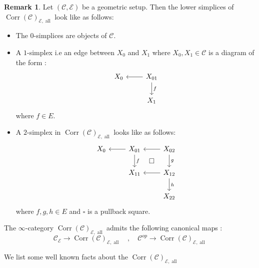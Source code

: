 \documentclass[14pt]{article}
\theoremstyle{definition}
\newtheorem{remark}[theorem]{Remark}
\newcommand{\E}{\mathcal{E}}
\newcommand{\op}[1]{\operatorname{#1}}
\newcommand{\Ca}{\mathcal{C}}
\numberwithin{subsection}{section}
\begin{document}
    \begin{remark}
Let $(\Ca,\E)$ be a geometric setup. Then the lower simplices of $\op{Corr}(\Ca)_{\E,\op{all}}$ look like as follows:
     \begin{itemize}
         \item The $0$-simplices are objects of $\Ca$.
         \item A $1$-simplex i.e an edge between $X_0$ and $X_1$ where $X_0,X_1 \in \Ca$ is a diagram of the form :
         \begin{equation*}
             \begin{tikzcd}
                 X_0 & X_{01}\arrow[l] \arrow[d,"f"] \\
                 {} & X_1
             \end{tikzcd}
         \end{equation*}
         where $f \in E$.
         \item A $2$-simplex in $\op{Corr}(\Ca)_{\E,\op{all}}$ looks like as follows:
         \begin{equation*}
             \begin{tikzcd}
                 X_0 & X_{01} \arrow[l] \arrow[d,"f"]  \arrow[dr, phantom, "\square"]  & X_{02} \arrow[l] \arrow[d,"g"] \\
                 {} & X_{11}  & X_{12} \arrow[d,"h"] \arrow[l] \\
                 {} & {} & X_{22}
             \end{tikzcd}
         \end{equation*}
         where $f,g,h\in E$ and $\square$ is a pullback square.
     \end{itemize}
         The $\infty$-category $\op{Corr}(\Ca)_{\E,\op{all}}$ admits the following canonical maps :
    \begin{equation*}
        \Ca_{\E} \to \op{Corr}(\Ca)_{\E,\op{all}} \quad,\quad \Ca^{op} \to \op{Corr}(\Ca)_{\E,\op{all}}
    \end{equation*}



         \end{remark}

       We list some well known facts about the $\op{Corr}(\Ca)_{\E,\op{all}}$ 
\end{document}
